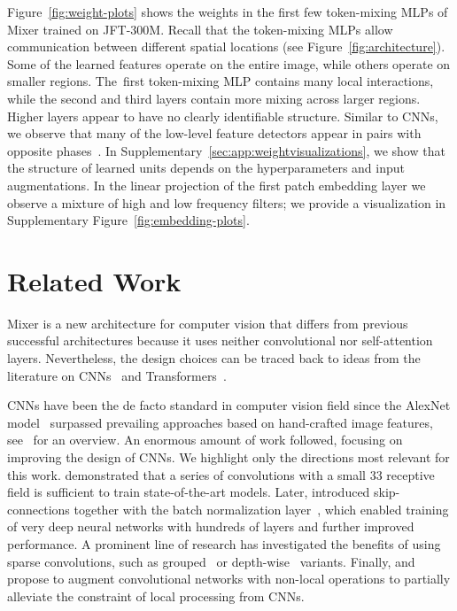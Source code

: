 \documentclass{article}
\newcommand{\name}{Mixer}
\begin{document}
Figure~\ref{fig:weight-plots} shows the weights in the first few token-mixing MLPs of \name{} trained on JFT-300M. 
Recall that the token-mixing MLPs allow communication between different spatial locations (see Figure~\ref{fig:architecture}). 
Some of the learned features operate on the entire image, while others operate on smaller regions. 
The~first token-mixing MLP contains many local interactions, while the second and third layers contain more mixing across larger regions.
Higher layers appear to have no clearly identifiable structure. 
Similar to CNNs, we observe that many of the low-level feature detectors appear in pairs with opposite phases~\cite{shang2016crelu}.
In Supplementary~\ref{sec:app:weightvisualizations}, we show that the structure of learned units depends on the hyperparameters and input augmentations.
In the linear projection of the first patch embedding layer we observe a mixture of high and low frequency filters; we provide a visualization in Supplementary Figure~\ref{fig:embedding-plots}.


\section{Related Work}

\name{} is a new architecture for computer vision that differs from previous successful architectures because it uses neither convolutional nor self-attention layers. Nevertheless, the design choices can be traced back to ideas from the literature on  CNNs~\cite{KrizhevskyNIPS12,LeCun1989BackpropagationAT} and Transformers~\cite{vaswani2017}.

CNNs have been the de facto standard in computer vision field since the AlexNet model~\cite{KrizhevskyNIPS12} surpassed prevailing approaches based on hand-crafted image features, see~\cite{pinz2006object} for an overview.
An enormous amount of work followed, focusing on improving the design of CNNs. 
We highlight only the directions most relevant for this work. 
\citet{simonyan2014very} demonstrated that a series of convolutions with a small 33 receptive field is sufficient to train state-of-the-art models. 
Later, \citet{he2016deep} introduced skip-connections together with the batch normalization layer~\cite{ioffe2015batch}, which enabled training of very deep neural networks with hundreds of layers and further improved performance.
A prominent line of research has investigated the benefits of using sparse convolutions, such as grouped~\cite{Xie2016} or depth-wise~\cite{chollet2017xception,howard2017mobilenets} variants. 
Finally, \citet{hu2018squeeze} and \citet{wang2018-nonlocalnn} propose to augment convolutional networks with non-local operations to partially alleviate the constraint of local processing from CNNs.
\end{document}
